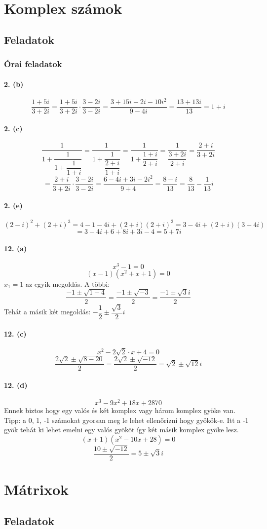 \documentclass[12pt,a4paper,fleqn]{article}
\newcommand{\myparagraph}[1]{\paragraph{#1}\mbox{}}
\begin{document}
\clearpage
\section{Komplex számok}
\setcounter{subsection}{1}
\subsection{Feladatok}
\subsubsection{Órai feladatok}

\myparagraph{2. (b)}
\[ \dfrac{1+5i}{3+2i} = \dfrac{1+5i}{3+2i} \cdot \dfrac{3-2i}{3-2i} =
  \dfrac{3+15i-2i-10i^2}{9-4i} = \dfrac{13+13i}{13} = 1+i
\]

\myparagraph{2. (c)}
\[ \dfrac{1}{1+\dfrac{1}{1+\dfrac{1}{1+i}}} = \dfrac{1}{1+\dfrac{1}{\dfrac{2+i}{1+i}}}
  = \dfrac{1}{1+\dfrac{1+i}{2+i}} = \dfrac{1}{\dfrac{3+2i}{2+i}} = \dfrac{2+i}{3+2i}
\]
\[ = \dfrac{2+i}{3+2i} \cdot \dfrac{3-2i}{3-2i} = \dfrac{6-4i+3i-2i^2}{9+4}
  = \dfrac{8-i}{13} = \dfrac{8}{13} - \dfrac{1}{13}i
\]

\myparagraph{2. (e)}
\[ (2-i)^2+(2+i)^3 = 4-1-4i+(2+i)(2+i)^2 = 3 - 4i + (2+i)(3+4i) \]
\[ = 3 - 4i + 6 +8i +3i -4 = 5+7i \]

\myparagraph{12. (a)}
\[ x^3-1 = 0 \]
\[ (x-1)(x^2+x+1) = 0 \]
$x_1 = 1$ az egyik megoldás. A többi:
\[ \dfrac{-1\pm \sqrt{1-4}}{2} = \dfrac{-1\pm \sqrt{-3}}{2} = \dfrac{-1\pm \sqrt{3}i}{2} \]
Tehát a másik két megoldás: $-\dfrac{1}{2} \pm \dfrac{\sqrt{3}}{2}i$

\myparagraph{12. (c)}
\[ x^2-2\sqrt{2} \cdot x + 4 = 0 \]
\[ \dfrac{2\sqrt{2} \pm \sqrt{8-20}}{2} = \dfrac{2\sqrt{2} \pm \sqrt{-12}}{2}
  = \sqrt{2} \pm \sqrt{12}i
\]

\myparagraph{12. (d)}
\[ x^3-9x^2+18x+28 7 0 \]
Ennek biztos hogy egy valós és két komplex vagy három komplex gyöke van.\\
Tipp: a 0, 1, -1 számokat gyorsan meg le lehet ellenőrizni hogy gyökök-e. Itt a
-1 gyök tehát ki lehet emelni egy valós gyököt így két másik komplex gyöke lesz.
\[ (x+1)(x^2-10x+28) = 0 \]
\[ \dfrac{10 \pm \sqrt{-12}}{2} = 5 \pm \sqrt{3}i \]


\clearpage
\section{Mátrixok}
\setcounter{subsection}{1}
\subsection{Feladatok}
\end{document}
